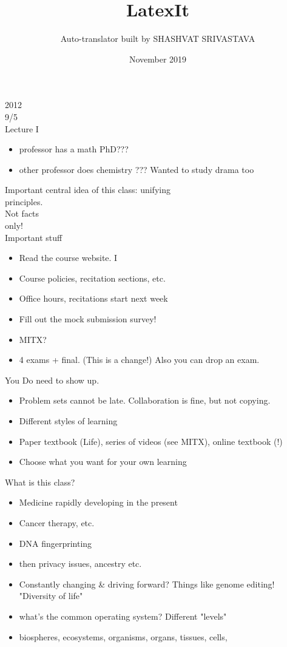\documentclass{article}
\title{LatexIt}
\author{Auto-translator built by SHASHVAT SRIVASTAVA}
\date{November 2019}
\begin{document}
2012\\
9/5\\
Lecture I\\
\begin{itemize}\item  professor has a math PhD???
\item  other professor does chemistry ??? Wanted to study drama too
\end{itemize}
Important central idea of this class: unifying\\
principles.\\
Not facts\\
only!\\
Important stuff\\
\begin{itemize}\item  Read the course website.
I \item  Course policies, recitation sections, etc.
\item  Office hours, recitations start next week
\item  Fill out the mock submission survey!
\item  MITX?
\item 4 exams + final. (This is a change!) Also you can drop an exam.
\end{itemize}
You Do need to show up.\\
\begin{itemize}\item  Problem sets cannot be late. Collaboration is fine, but not copying.
\item  Different styles of learning
\item  Paper textbook (Life), series of videos (see MITX), online textbook (!)
\item  Choose what you want for your own learning
\end{itemize}
What is this class?\\
\begin{itemize}\item  Medicine rapidly developing in the present
\item  Cancer therapy, etc.
\item  DNA fingerprinting \item  then privacy issues, ancestry etc.
\item  Constantly changing \& driving forward? Things like genome editing!
"Diversity of life" \item  what's the common operating system?
Different "levels" \item  biospheres, ecosystems, organisms, organs, tissues, cells,
\end{itemize}
\end{document}
